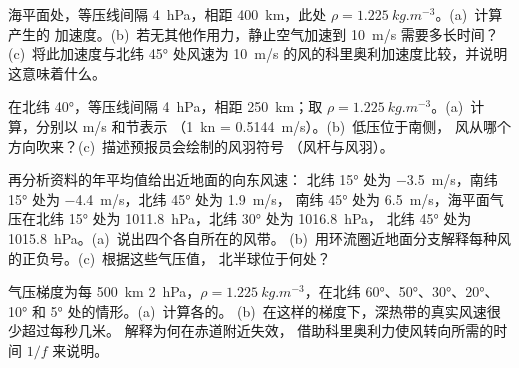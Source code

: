 \begin{exercise}[$\star$]\label{exo:b1:atmospheric-circulation:2}
海平面处，等压线间隔 \qty{4}{hPa}，相距 \qty{400}{km}，此处 $\rho =
\qty{1.225}{kg.m^{-3}}$。(a)~计算产生的
加速度。(b)~若无其他作用力，静止空气加速到 \qty{10}{m/s}
需要多长时间？(c)~将此加速度与北纬 \ang{45} 处风速为
\qty{10}{m/s} 的风的科里奥利加速度比较，并说明这意味着什么。
\end{exercise}

\begin{exercise}[$\star$]\label{exo:b1:atmospheric-circulation:3}
在北纬 \ang{40}，等压线间隔 \qty{4}{hPa}，相距 \qty{250}{km}；取 $\rho =
\qty{1.225}{kg.m^{-3}}$。(a)~计算，分别以 \unit{m/s} 和节表示
（\qty{1}{kn} = \qty{0.5144}{m/s}）。(b)~低压位于南侧，
风从哪个方向吹来？(c)~描述预报员会绘制的风羽符号
（风杆与风羽）。
\end{exercise}

\begin{exercise}[$\star$]\label{exo:b1:atmospheric-circulation:4}
再分析资料的年平均值给出近地面的向东风速：
北纬 \ang{15} 处为 \qty{-3.5}{m/s}，南纬 \ang{15} 处为 \qty{-4.4}{m/s}，北纬 \ang{45} 处为 \qty{+1.9}{m/s}，
南纬 \ang{45} 处为 \qty{+6.5}{m/s}，海平面气压在北纬 \ang{15} 处为
\qty{1011.8}{hPa}，北纬 \ang{30} 处为 \qty{1016.8}{hPa}，
北纬 \ang{45} 处为 \qty{1015.8}{hPa}。(a)~说出四个各自所在的风带。
(b)~用环流圈近地面分支解释每种风的正负号。(c)~根据这些气压值，
北半球位于何处？
\end{exercise}

\begin{exercise}[$\star\star$]\label{exo:b1:atmospheric-circulation:5}
气压梯度为每 \qty{500}{km} \qty{2}{hPa}，$\rho =
\qty{1.225}{kg.m^{-3}}$，在北纬 \ang{60}、\ang{50}、\ang{30}、\ang{20}、
\ang{10} 和 \ang{5} 处的情形。(a)~计算各的。
(b)~在这样的梯度下，深热带的真实风速很少超过每秒几米。
解释为何在赤道附近失效，
借助科里奥利力使风转向所需的时间 $1/f$ 来说明。
\end{exercise}

